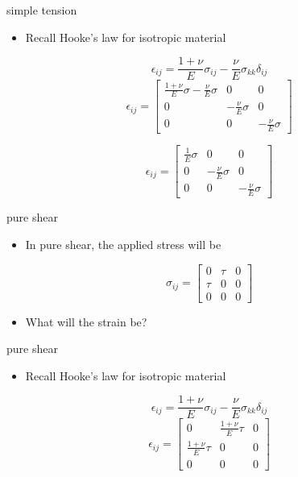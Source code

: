 \documentclass[
  letterpaper,
  ignorenonframetext,
  aspectratio=43,
  handout,
  12pt]{beamer}
\providecommand{\tightlist}{%
  \setlength{\itemsep}{0pt}\setlength{\parskip}{0pt}}
\providecommand{\tightlist}{%
\setlength{\itemsep}{0pt}\setlength{\parskip}{0pt}}
\begin{document}
\begin{frame}{simple tension}
\protect\hypertarget{simple-tension-2}{}
\begin{itemize}
\tightlist
\item
  Recall Hooke's law for isotropic material
\end{itemize}

\[\epsilon_{ij} = \frac{1+\nu}{E}\sigma_{ij} - \frac{\nu}{E}\sigma_{kk} \delta_{ij}\]
\[\epsilon_{ij} = \begin{bmatrix}
    \frac{1+\nu}{E} \sigma - \frac{\nu}{E}\sigma &0 &0\\
    0 & -\frac{\nu}{E}\sigma & 0\\
    0 & 0 & -\frac{\nu}{E}\sigma
\end{bmatrix}\]

\[\epsilon_{ij} = \begin{bmatrix}
    \frac{1}{E} \sigma &0 &0\\
    0 & -\frac{\nu}{E}\sigma & 0\\
    0 & 0 & -\frac{\nu}{E}\sigma
\end{bmatrix}\]
\end{frame}

\begin{frame}{pure shear}
\protect\hypertarget{pure-shear}{}
\begin{itemize}
\tightlist
\item
  In pure shear, the applied stress will be
\end{itemize}

\[\sigma_{ij} = \begin{bmatrix}
    0 & \tau & 0 \\
    \tau & 0 & 0\\
    0 & 0 & 0
\end{bmatrix}\]

\begin{itemize}
\tightlist
\item
  What will the strain be?
\end{itemize}
\end{frame}

\begin{frame}{pure shear}
\protect\hypertarget{pure-shear-1}{}
\begin{itemize}
\tightlist
\item
  Recall Hooke's law for isotropic material
\end{itemize}

\[\epsilon_{ij} = \frac{1+\nu}{E}\sigma_{ij} - \frac{\nu}{E}\sigma_{kk} \delta_{ij}\]
\[\epsilon_{ij} = \begin{bmatrix}
    0 &\frac{1+\nu}{E}\tau &0\\
    \frac{1+\nu}{E}\tau & 0 & 0\\
    0 & 0 & 0
\end{bmatrix}\]
\end{frame}
\end{document}
